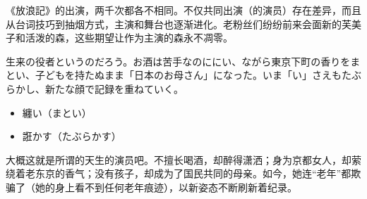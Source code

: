 \documentclass{ctexart}
\newcommand{\bbigbreak}{\bigbreak \bigbreak}
\begin{document}
\rmfamily
《放浪記》的出演，两千次都各不相同。不仅共同出演（的演员）存在差异，而且从台词技巧到抽烟方式，主演和舞台也逐渐进化。老粉丝们纷纷前来会面新的芙美子和活泼的森，这些期望让作为主演的森永不凋零。

\bbigbreak

\mincho
生来の役者というのだろう。お酒は苦手なのににい、ながら東京下町の香りをまとい、子どもを持たぬまま「日本のお母さん」になった。いま「い」さえもたぶらかし、新たな顔で記録を重ねていく。

\begin{itemize}
    \mincho
    \item 纏い（まとい）
    \item 誑かす（たぶらかす）
\end{itemize}

\rmfamily
大概这就是所谓的天生的演员吧。不擅长喝酒，却醉得潇洒；身为京都女人，却萦绕着老东京的香气；没有孩子，却成为了国民共同的母亲。如今，她连“老年”都欺骗了（她的身上看不到任何老年痕迹），以新姿态不断刷新着纪录。

\bbigbreak


\end{document}

